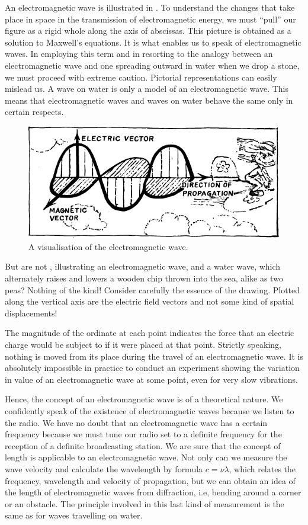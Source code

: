 An electromagnetic wave is illustrated in . To understand the changes that take place in space in the transmission of electromagnetic energy, we must ``pull'' our figure as a rigid whole along the axis of abscissas. This picture is obtained as a solution to Maxwell's equations. It is what enables us to speak of electromagnetic waves. In employing this term and in resorting to the analogy between an electromagnetic wave and one spreading outward in water when we drop a stone, we must proceed with extreme caution. Pictorial representations can easily mislead us. A wave on water is only a model of an electromagnetic wave. This means that electromagnetic waves and waves on water behave the same only in certain respects.

\begin{figure}[!ht]
\centering
\includegraphics[width=\textwidth]{figures/fig-05-03.pdf}
\caption{A visualisation of the electromagnetic wave.}
\label{fig-5.3}
\end{figure}

But are not , illustrating an electromagnetic wave, and a water wave, which alternately raises and lowers a wooden chip thrown into the sea, alike as two peas? Nothing of the kind! Consider carefully the essence of the drawing. Plotted along the vertical axis are the electric field vectors and not some kind of spatial displacements!

The magnitude of the ordinate at each point indicates the force that an electric charge would be subject to if it were placed at that point. Strictly speaking, nothing is moved from its place during the travel of an electromagnetic wave. It is absolutely impossible in practice to conduct an experiment showing the variation in value of an electromagnetic wave at some point, even for very slow vibrations.

Hence, the concept of an electromagnetic wave is of a theoretical nature. We confidently speak of the existence of electromagnetic waves because we listen to the radio. We have no doubt that an electromagnetic wave has a certain frequency because we must tune our radio set to a definite frequency for the reception of a definite broadcasting station. We are sure that the concept of length is applicable to an electromagnetic wave. Not only can we measure the wave velocity and calculate the wavelength by formula $c = \nu \lambda$, which relates the frequency, wavelength and velocity of propagation, but we can obtain an idea of the length of electromagnetic waves from diffraction, i.e, bending around a corner or an obstacle. The principle involved in this last kind of measurement is the same as for waves travelling on water.

